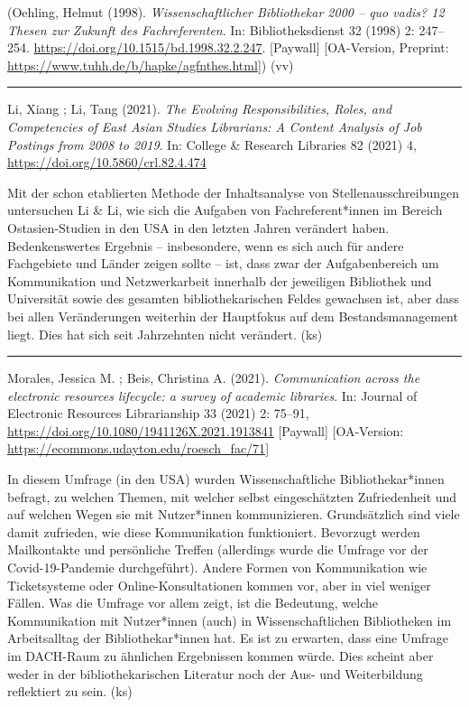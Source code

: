 \documentclass[a4paper,
fontsize=11pt,
oneside,
numbers=noperiodatend,
parskip=half-,
bibliography=totoc,
final
]{scrartcl}
\begin{document}
(Oehling, Helmut (1998). \emph{Wissenschaftlicher Bibliothekar 2000 --
quo vadis? 12 Thesen zur Zukunft des Fachreferenten}. In:
Bibliotheksdienst 32 (1998) 2: 247--254.
\url{https://doi.org/10.1515/bd.1998.32.2.247}. {[}Paywall{]}
{[}OA-Version, Preprint:
\url{https://www.tuhh.de/b/hapke/agfnthes.html}{]}) (vv)

\begin{center}\rule{0.5\linewidth}{0.5pt}\end{center}

Li, Xiang ; Li, Tang (2021). \emph{The Evolving Responsibilities, Roles,
and Competencies of East Asian Studies Librarians: A Content Analysis of
Job Postings from 2008 to 2019}. In: College \& Research Libraries 82
(2021) 4, \url{https://doi.org/10.5860/crl.82.4.474}

Mit der schon etablierten Methode der Inhaltsanalyse von
Stellenausschreibungen untersuchen Li \& Li, wie sich die Aufgaben von
Fachreferent*innen im Bereich Ostasien-Studien in den USA in den letzten
Jahren verändert haben. Bedenkenswertes Ergebnis -- insbesondere, wenn
es sich auch für andere Fachgebiete und Länder zeigen sollte -- ist,
dass zwar der Aufgabenbereich um Kommunikation und Netzwerkarbeit
innerhalb der jeweiligen Bibliothek und Universität sowie des gesamten
bibliothekarischen Feldes gewachsen ist, aber dass bei allen
Veränderungen weiterhin der Hauptfokus auf dem Bestandsmanagement liegt.
Dies hat sich seit Jahrzehnten nicht verändert. (ks)

\begin{center}\rule{0.5\linewidth}{0.5pt}\end{center}

Morales, Jessica M. ; Beis, Christina A. (2021). \emph{Communication
across the electronic resources lifecycle: a survey of academic
libraries}. In: Journal of Electronic Resources Librarianship 33 (2021)
2: 75--91, \url{https://doi.org/10.1080/1941126X.2021.1913841}
{[}Paywall{]} {[}OA-Version:
\url{https://ecommons.udayton.edu/roesch_fac/71}{]}

In diesem Umfrage (in den USA) wurden Wissenschaftliche
Bibliothekar*innen befragt, zu welchen Themen, mit welcher selbst
eingeschätzten Zufriedenheit und auf welchen Wegen sie mit Nutzer*innen
kommunizieren. Grundsätzlich sind viele damit zufrieden, wie diese
Kommunikation funktioniert. Bevorzugt werden Mailkontakte und
persönliche Treffen (allerdings wurde die Umfrage vor der
Covid-19-Pandemie durchgeführt). Andere Formen von Kommunikation wie
Ticketsysteme oder Online-Konsultationen kommen vor, aber in viel
weniger Fällen. Was die Umfrage vor allem zeigt, ist die Bedeutung,
welche Kommunikation mit Nutzer*innen (auch) in Wissenschaftlichen
Bibliotheken im Arbeitsalltag der Bibliothekar*innen hat. Es ist zu
erwarten, dass eine Umfrage im DACH-Raum zu ähnlichen Ergebnissen kommen
würde. Dies scheint aber weder in der bibliothekarischen Literatur noch
der Aus- und Weiterbildung reflektiert zu sein. (ks)
\end{document}
